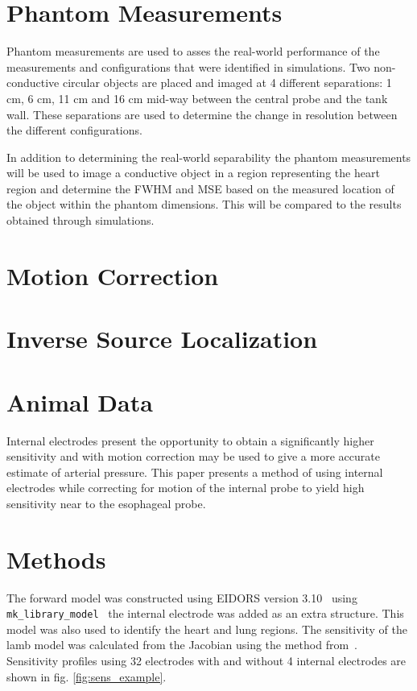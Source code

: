 \section{Phantom Measurements}
Phantom measurements are used to asses the real-world performance 
of the measurements and configurations 
that were identified in simulations. Two non-conductive circular 
objects are placed and imaged at 4 different separations: 
1 cm, 6 cm, 11 cm and 16 cm 
mid-way between the central probe and the tank wall. 
These separations are used to determine the change 
in resolution between the different configurations. 

In addition to determining the real-world separability the phantom measurements will be used to image a conductive object in a region 
representing the heart region and determine the FWHM and MSE based on the measured location of the object within the phantom dimensions. 
This will be compared to the results obtained through simulations.

\section{Motion Correction}

\section{Inverse Source Localization}

\section{Animal Data}

Internal electrodes present the opportunity to obtain
a significantly higher sensitivity and with motion correction 
may be used to give a more accurate estimate of arterial pressure.
This paper presents a method of using internal electrodes
while correcting for motion of the internal probe to yield 
high sensitivity near to the esophageal probe.

\section{Methods}
The forward model was constructed using EIDORS version 
3.10~\cite{Adler2019} using \verb!mk_library_model!~\cite{Grychtol2012} 
the internal electrode was added
as an extra structure. This model was also used
to identify the heart and lung regions.
The sensitivity of the lamb model was calculated from 
the Jacobian using 
the method from~\cite{Stowe2020}.
Sensitivity profiles using 32 electrodes with
and without 4 internal electrodes
are shown in fig. \ref{fig:sens_example}.

